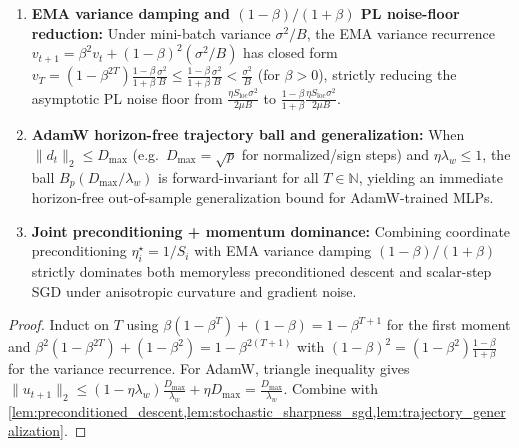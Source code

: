 \begin{lemma}
\begin{enumerate}
\item \textbf{EMA variance damping and $(1-\beta)/(1+\beta)$ PL noise-floor reduction:} Under mini-batch variance $\sigma^2/B$, the EMA variance recurrence $v_{t+1} = \beta^2 v_t + (1-\beta)^2(\sigma^2/B)$ has closed form $v_T = (1-\beta^{2T})\frac{1-\beta}{1+\beta}\frac{\sigma^2}{B} \le \frac{1-\beta}{1+\beta}\frac{\sigma^2}{B} < \frac{\sigma^2}{B}$ (for $\beta>0$), strictly reducing the asymptotic PL noise floor from $\frac{\eta S_{\mathrm{loc}}\sigma^2}{2\mu B}$ to $\frac{1-\beta}{1+\beta}\frac{\eta S_{\mathrm{loc}}\sigma^2}{2\mu B}$.
\item \textbf{AdamW horizon-free trajectory ball and generalization:} When $\|d_t\|_2 \le D_{\max}$ (e.g.\ $D_{\max}=\sqrt{p}$ for normalized/sign steps) and $\eta\lambda_w \le 1$, the ball $B_p(D_{\max}/\lambda_w)$ is forward-invariant for all $T\in\mathbb{N}$, yielding an immediate horizon-free out-of-sample generalization bound for AdamW-trained MLPs.
\item \textbf{Joint preconditioning + momentum dominance:} Combining coordinate preconditioning $\eta_i^\star = 1/S_i$ with EMA variance damping $(1-\beta)/(1+\beta)$ strictly dominates both memoryless preconditioned descent and scalar-step SGD under anisotropic curvature and gradient noise.
\end{enumerate}
\end{lemma}
\begin{proof}
\leanok
Induct on $T$ using $\beta(1-\beta^T) + (1-\beta) = 1-\beta^{T+1}$ for the first moment and $\beta^2(1-\beta^{2T}) + (1-\beta^2) = 1-\beta^{2(T+1)}$ with $(1-\beta)^2 = (1-\beta^2)\frac{1-\beta}{1+\beta}$ for the variance recurrence. For AdamW, triangle inequality gives $\|u_{t+1}\|_2 \le (1-\eta\lambda_w)\frac{D_{\max}}{\lambda_w} + \eta D_{\max} = \frac{D_{\max}}{\lambda_w}$. Combine with \cref{lem:preconditioned_descent,lem:stochastic_sharpness_sgd,lem:trajectory_generalization}.
\end{proof}

